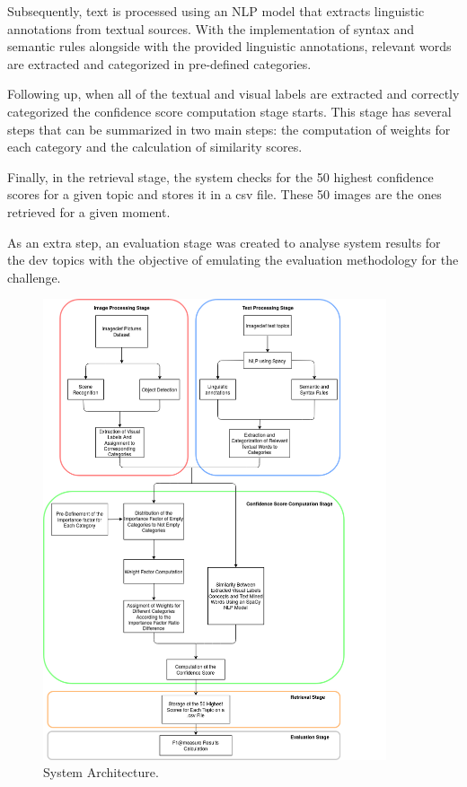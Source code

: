 Subsequently, text is processed using an NLP model that extracts linguistic annotations from textual sources.  With the implementation of syntax and semantic rules alongside with the provided linguistic annotations, relevant words are extracted and categorized in pre-defined categories. 

Following up, when all of the textual and visual labels are extracted and correctly categorized the confidence score computation stage starts. This stage has several steps that can be summarized in two main steps: the computation of weights for each category and the calculation of similarity scores.

Finally, in the retrieval stage, the system checks for the 50 highest confidence scores for a given topic and stores it in a csv file. These 50 images are the ones retrieved for a given moment.

As an extra step, an evaluation stage was created to analyse system results for the dev topics with the objective of emulating the evaluation methodology for the challenge.


   
\begin{figure}[H]
   
    \captionsetup{justification=centering}
    \hspace{+1cm} \includegraphics[width = 0.9\textwidth]{Sections/6textprocessing/images/diagram.png}
    \caption{System Architecture.}
    \label{fig:system_architecture}
  \end{figure}

